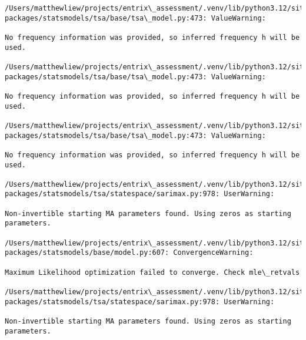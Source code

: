 \documentclass[11pt]{article}
\begin{document}
    \begin{Verbatim}[commandchars=\\\{\}]
/Users/matthewliew/projects/entrix\_assessment/.venv/lib/python3.12/site-
packages/statsmodels/tsa/base/tsa\_model.py:473: ValueWarning:

No frequency information was provided, so inferred frequency h will be used.

/Users/matthewliew/projects/entrix\_assessment/.venv/lib/python3.12/site-
packages/statsmodels/tsa/base/tsa\_model.py:473: ValueWarning:

No frequency information was provided, so inferred frequency h will be used.

/Users/matthewliew/projects/entrix\_assessment/.venv/lib/python3.12/site-
packages/statsmodels/tsa/base/tsa\_model.py:473: ValueWarning:

No frequency information was provided, so inferred frequency h will be used.

/Users/matthewliew/projects/entrix\_assessment/.venv/lib/python3.12/site-
packages/statsmodels/tsa/statespace/sarimax.py:978: UserWarning:

Non-invertible starting MA parameters found. Using zeros as starting parameters.

/Users/matthewliew/projects/entrix\_assessment/.venv/lib/python3.12/site-
packages/statsmodels/base/model.py:607: ConvergenceWarning:

Maximum Likelihood optimization failed to converge. Check mle\_retvals

/Users/matthewliew/projects/entrix\_assessment/.venv/lib/python3.12/site-
packages/statsmodels/tsa/statespace/sarimax.py:978: UserWarning:

Non-invertible starting MA parameters found. Using zeros as starting parameters.

    \end{Verbatim}
\end{document}

